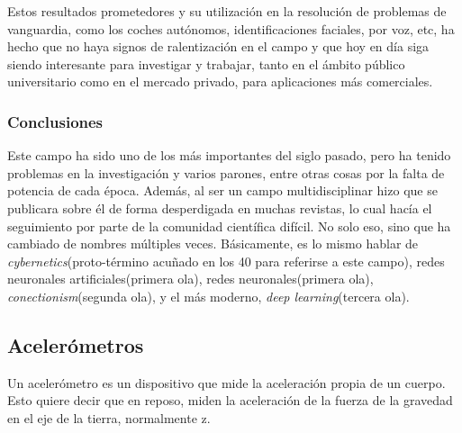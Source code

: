 \documentclass[12pt]{article}
\numberwithin{equation}{section}
\begin{document}
Estos resultados prometedores y su utilización en la resolución de problemas de vanguardia, como los coches autónomos, identificaciones faciales, por voz, etc,  ha hecho que no haya signos de ralentización en el campo y que hoy en día siga siendo interesante para investigar y trabajar, tanto en el ámbito público universitario como en el mercado privado, para aplicaciones más comerciales.


\subsubsection{Conclusiones}

Este campo ha sido uno de los más importantes del siglo pasado, pero ha tenido problemas en la investigación y varios parones, entre otras cosas por la falta de potencia de cada época. Además, al ser un campo multidisciplinar hizo que se publicara sobre él de forma desperdigada en muchas revistas, lo cual hacía el seguimiento por parte de la comunidad científica difícil. No solo eso, sino que ha cambiado de nombres múltiples veces. Básicamente, es lo mismo hablar de \textit{cybernetics}(proto-término acuñado en los 40 para referirse a este campo), redes neuronales artificiales(primera ola), redes neuronales(primera ola), \textit{conectionism}(segunda ola), y el más moderno, \textit{deep learning}(tercera ola).

\subsection{Acelerómetros}

Un acelerómetro es un dispositivo que mide la aceleración propia de un cuerpo. Esto quiere decir que en reposo, miden la aceleración de la fuerza de la gravedad en el eje de la tierra, normalmente z.
\end{document}

